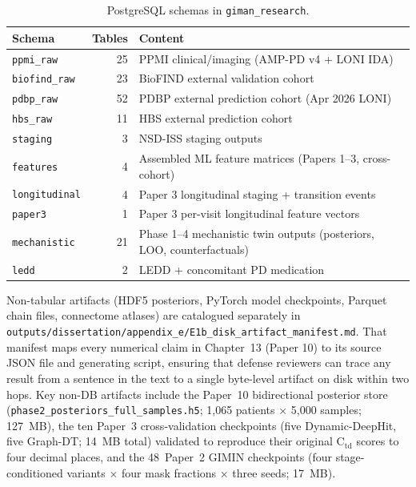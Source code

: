 \begin{table}[h]
  \centering
  \caption{PostgreSQL schemas in \texttt{giman\_research}.}
  \label{tab:e1-schemas}
  \begin{tabular}{lrl}
    \toprule
    Schema & Tables & Content \\
    \midrule
    \texttt{ppmi\_raw}       & 25 & PPMI clinical/imaging (AMP-PD v4 + LONI IDA) \\
    \texttt{biofind\_raw}    & 23 & BioFIND external validation cohort \\
    \texttt{pdbp\_raw}       & 52 & PDBP external prediction cohort (Apr 2026 LONI) \\
    \texttt{hbs\_raw}        & 11 & HBS external prediction cohort \\
    \texttt{staging}         & 3  & NSD-ISS staging outputs \\
    \texttt{features}        & 4  & Assembled ML feature matrices (Papers 1--3, cross-cohort) \\
    \texttt{longitudinal}    & 4  & Paper 3 longitudinal staging + transition events \\
    \texttt{paper3}          & 1  & Paper 3 per-visit longitudinal feature vectors \\
    \texttt{mechanistic}     & 21 & Phase 1--4 mechanistic twin outputs (posteriors, LOO, counterfactuals) \\
    \texttt{ledd}            & 2  & LEDD + concomitant PD medication \\
    \bottomrule
  \end{tabular}
\end{table}

Non-tabular artifacts (HDF5 posteriors, PyTorch model checkpoints, Parquet chain
files, connectome atlases) are catalogued separately in
\texttt{outputs/dissertation/appendix\_e/E1b\_disk\_artifact\_manifest.md}. That
manifest maps every numerical claim in Chapter~13 (Paper 10) to its source JSON
file and generating script, ensuring that defense reviewers can trace any
result from a sentence in the text to a single byte-level artifact on disk
within two hops. Key non-DB artifacts include the Paper~10 bidirectional
posterior store
(\texttt{phase2\_posteriors\_full\_samples.h5}; 1{,}065 patients $\times$
5{,}000 samples; 127~MB), the ten Paper~3 cross-validation checkpoints (five
Dynamic-DeepHit, five Graph-DT; 14~MB total) validated to reproduce their
original C$_\mathrm{td}$ scores to four decimal places, and the 48~Paper~2 GIMIN
checkpoints (four stage-conditioned variants $\times$ four mask fractions
$\times$ three seeds; 17~MB).

